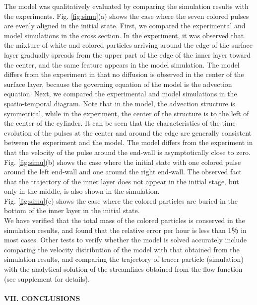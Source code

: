 \documentclass[prl,twocolumn,superscriptaddress]{revtex4}
\begin{document}
The model was qualitatively evaluated by comparing the simulation results with the experiments. Fig. \ref{fig:simu}(a) shows the case where the seven colored pulses are evenly aligned in the initial state. First, we compared the experimental and model simulations in the cross section. In the experiment, it was observed that the mixture of white and colored particles arriving around the edge of the surface layer gradually spreads from the upper part of the edge of the inner layer toward the center, and the same feature appears in the model simulation. The model differs from the experiment in that no diffusion is observed in the center of the surface layer, because the governing equation of the model is the advection equation. Next, we compared the experimental and model simulations in the spatio-temporal diagram. Note that in the model, the advection structure is symmetrical, while in the experiment, the center of the structure is to the left of the center of the cylinder. It can be seen that the characteristics of the time evolution of the pulses at the center and around the edge are generally consistent between the experiment and the model. The model differs from the experiment in that the velocity of the pulse around the end-wall is asymptotically close to zero. \\
Fig. \ref{fig:simu}(b) shows the case where the initial state with one colored pulse around the left end-wall and one around the right end-wall. The observed fact that the trajectory of the inner layer does not appear in the initial stage, but only in the middle, is also shown in the simulation. \\
Fig. \ref{fig:simu}(c) shows the case where the colored particles are buried in the bottom of the inner layer in the initial state. \\
We have verified that the total mass of the colored particles is conserved in the simulation results, and found that the relative error per hour is less than 1％ in most cases. Other tests to verify whether the model is solved accurately include comparing the velocity distribution of the model with that obtained from the simulation results, and comparing the trajectory of tracer particle (simulation) with the analytical solution of the streamlines obtained from the flow function (see supplement for details). \\
\\
{\bf V\hspace{-.1em}I\hspace{-.1em}I. CONCLUSIONS} \\
\end{document}
